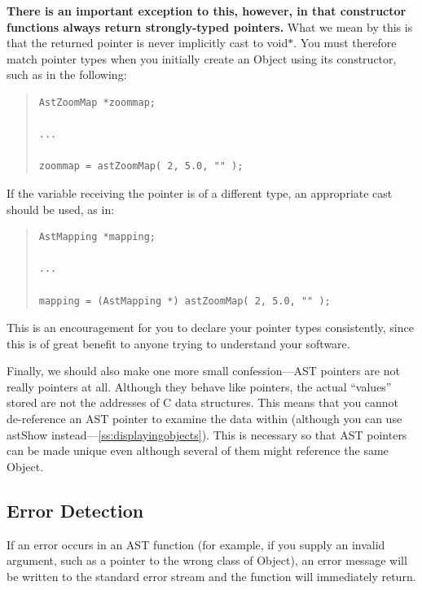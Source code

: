 \documentclass[twoside,11pt]{article}
\newcommand{\htmlref}[2]{#1}
\newcommand{\secref}[1]{\S\ref{#1}}
\renewcommand{\secref}[1]{\ref{#1}}
\begin{document}
{\bf{There is an important exception to this, however, in that
constructor functions always return strongly-typed pointers.}}  What
we mean by this is that the returned pointer is never implicitly cast
to void$*$. You must therefore match pointer types when you initially
create an Object using its constructor, such as in the following:

\begin{quote}
\small
\begin{verbatim}
AstZoomMap *zoommap;

...

zoommap = astZoomMap( 2, 5.0, "" );
\end{verbatim}
\normalsize
\end{quote}

If the variable receiving the pointer is of a different type, an
appropriate cast should be used, as in:

\begin{quote}
\small
\begin{verbatim}
AstMapping *mapping;

...

mapping = (AstMapping *) astZoomMap( 2, 5.0, "" );
\end{verbatim}
\normalsize
\end{quote}

This is an encouragement for you to declare your pointer types
consistently, since this is of great benefit to anyone trying to
understand your software.

Finally, we should also make one more small confession---AST pointers
are not really pointers at all.  Although they behave like pointers,
the actual ``values'' stored are not the addresses of C data
structures. This means that you cannot de-reference an AST pointer to
examine the data within (although you can use astShow
instead---\secref{ss:displayingobjects}). This is necessary so that AST
pointers can be made unique even although several of them might
reference the same Object.

\subsection{\label{ss:errordetection}Error Detection}

If an error occurs in an AST function (for example, if you supply an
invalid argument, such as a pointer to the wrong class of \htmlref{Object}{Object}), an
error message will be written to the standard error stream and the
function will immediately return.
\end{document}
